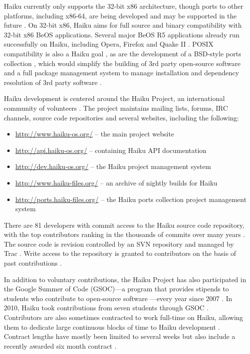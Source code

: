 \documentclass{article}
\begin{document}
Haiku currently only supports the 32-bit x86 architecture, though
ports to other platforms, including x86-64, are being developed and
may be supported in the future \cite{HaikuFaq}.  On 32-bit x86, Haiku
aims for full source and binary compatibility with 32-bit x86 BeOS
applications.  Several major BeOS R5 applications already run
successfully on Haiku, including Opera, Firefox and Quake II
\cite{HaikuWiki}.  POSIX compatibility is also a Haiku goal
\cite{HaikuFuture, HaikuIncContracts}, as are the development of a
BSD-style ports collection \cite{HaikuPorts}, which would simplify the
building of 3rd party open-source software and a full package
management system to manage installation and dependency resolution of
3rd party software \cite{HaikuR1A3Notes}.

Haiku development is centered around the Haiku Project, an
international community of volunteers \cite{HaikuAbout}.  The project
maintains mailing lists, forums, IRC channels, \cite{HaikuComm} source
code repositories \cite{HaikuGetSvn} and several websites, including
the following:
\begin{itemize}
  \item \url{http://www.haiku-os.org/} -- the main project website
  \item \url{http://api.haiku-os.org/} -- containing Haiku API documentation
  \item \url{http://dev.haiku-os.org/} -- the Haiku project management
    system
  \item \url{http://www.haiku-files.org/} -- an archive of nightly
    builds for Haiku
  \item \url{http://ports.haiku-files.org/} -- the Haiku ports collection
    project management system
\end{itemize}

There are 81 developers with commit access to the Haiku source code
repository, with the top contributors ranking in the thousands of
commits over many years \cite{HaikuContrib}.  The source code is
revision controlled by an SVN repository and managed by Trac
\cite{HaikuDevStart}.  Write access to the repository is granted to
contributors on the basis of past contributions \cite{HaikuDevStart}.

In addition to voluntary contributions, the Haiku Project has also
participated in the Google Summer of Code (GSOC)---a program that
provides stipends to students who contribute to open-source software
\cite{GSOCWiki}---every year since 2007 \cite{HaikuGSOC}.  In 2010,
Haiku took contributions from seven students through GSOC
\cite{HaikuGSOC2010}.  Contributors are also sometimes contracted to
work full-time on Haiku, allowing them to dedicate large continuous
blocks of time to Haiku development \cite{HaikuIncContracts}.
Contract lengths have mostly been limited to several weeks but also
include a recently awarded six month contract
\cite{HaikuLongContract}.
\end{document}
